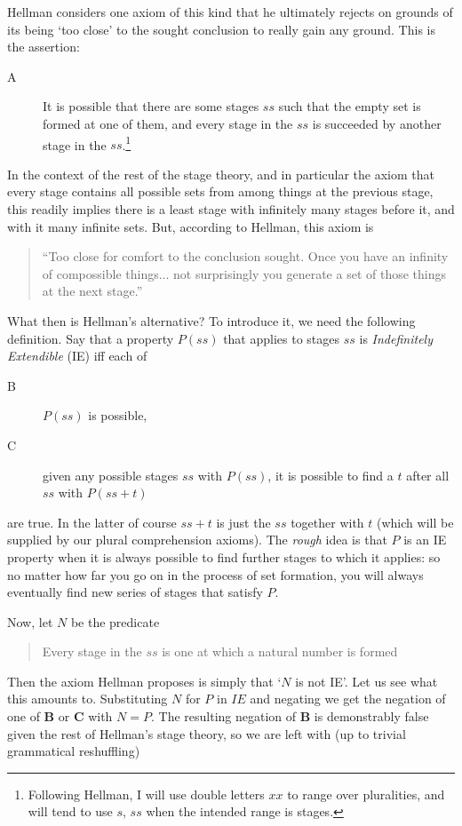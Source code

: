 \documentclass{asl}
\theoremstyle{definition}
\begin{document}
Hellman considers one axiom of this kind 
that he ultimately rejects on grounds of its being `too close' 
to the sought conclusion to really gain any ground. This is the assertion:
\begin{description}
\item[A] It is possible that there are some stages $ss$ 
such that the empty set is formed at one of them, 
and every stage in the $ss$ is succeeded by another stage in the $ss$.\footnote{
    Following Hellman, I will use double letters $xx$ to range over pluralities, 
    and will tend to use $s$, $ss$ when the intended range is stages.
    }
\end{description}
In the context of the rest of the stage theory, 
and in particular the axiom that every stage contains all possible sets 
from among things at the previous stage,
this readily implies there is a least stage with infinitely many stages before it, 
and with it many infinite sets. But, according to Hellman, this axiom is 
\begin{quote} ``Too close for comfort to the conclusion sought. 
    Once you have an infinity of compossible things... 
    not surprisingly you generate a set of those things at the next stage.''\end{quote}
What then is Hellman's alternative? To introduce it, 
we need the following definition. 
Say that a property $P(ss)$ that applies to stages $ss$ is
 \emph{Indefinitely Extendible} (IE) 
iff each of

\begin{description} 
    \item[B]    $P(ss)$ is possible,
    \item[C]    given any possible stages $ss$ with $P(ss)$, 
                it is possible to find a $t$ after all $ss$ with $P(ss + t)$
\end{description}
are true. In the latter of course $ss + t$ is just 
the $ss$ together with $t$ (which will be supplied by 
our plural comprehension axioms). The \emph{rough} idea is that $P$ is 
an IE property when it is always possible to find further 
stages to which it applies: so no matter how far you go on 
in the process of set formation, you will always eventually 
find new series of stages that satisfy $P$.

Now, let $N$ be the predicate
\begin{quote} Every stage in the $ss$ is one at which a natural number is formed
\end{quote} 
Then the axiom Hellman proposes is simply that `$N$ is not IE'. 
Let us see what this amounts to. Substituting $N$ for $P$ in $IE$ 
and negating we get the negation of one of {\bf B} or {\bf C} with $N = P$. 
The resulting negation of {\bf B} is demonstrably false 
given the rest of Hellman's stage theory, 
so we are left with (up to trivial grammatical reshuffling)
\end{document}
